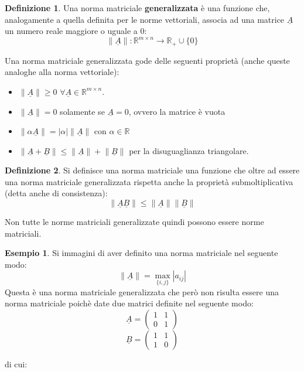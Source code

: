 \documentclass[12pt, a4paper]{book}
\theoremstyle{definition}
\newtheorem{exmp}{Esempio}[section]
\newtheorem{defn}{Definizione}[section]
\newcommand{\VarMtrx}[1]{\ensuremath{\underline{#1}}}
\begin{document}
\begin{flushleft}
\begin{defn}
Una norma matriciale \textbf{generalizzata} è una funzione che,  analogamente a quella definita per le norme vettoriali, associa ad una matrice \VarMtrx{A} un numero reale maggiore o uguale a 0: 
\[ \lVert \VarMtrx{A} \rVert:  \mathbb{R}^{m \times n } \longrightarrow \mathbb{R}_{+} \cup \{0\} \]
\end{defn}
Una norma matriciale generalizzata  gode delle seguenti proprietà (anche queste analoghe alla norma vettoriale): 
\begin{itemize}
	\item $\lVert \VarMtrx{A} \rVert \geq 0$ $\forall \VarMtrx{A} \in \mathbb{R}^{m \times n}$.
	\item $\lVert \VarMtrx{A} \rVert = 0$ solamente se $\VarMtrx{A} = 0$, ovvero la matrice è vuota
	\item $\lVert\alpha \VarMtrx{A}\rVert = |\alpha|\lVert\VarMtrx{A}\rVert$ con $\alpha \in \mathbb{R}$
	\item $\lVert \VarMtrx{A} + \VarMtrx{B}\rVert \leq \lVert \VarMtrx{A}\rVert + \lVert\VarMtrx{B}\rVert$ per la disuguaglianza triangolare.
\end{itemize}

\begin{defn}
Si definisce una norma matriciale una funzione che oltre ad essere una norma matriciale generalizzata rispetta anche la proprietà submoltiplicativa (detta anche di consistenza):
\[ \lVert \VarMtrx{A}\VarMtrx{B}\rVert \leq \lVert \VarMtrx{A}\rVert\lVert\VarMtrx{B}\rVert \]
\end{defn}

Non tutte le norme matriciali generalizzate quindi possono essere norme matriciali. 
\begin{exmp}
Si immagini di aver definito una norma matriciale nel seguente modo: 
\[ \lVert\VarMtrx{A}\rVert = \max_{\{i,j\}} |a_{ij}| \]
Questa è una norma matriciale generalizzata che però non risulta essere una norma matriciale poichè date due matrici definite nel seguente modo: 
\[ 
	\VarMtrx{A} = \begin{pmatrix} 1 & 1 \\ 0 & 1  \end{pmatrix} 
\]
\[ 
	\VarMtrx{B} = \begin{pmatrix} 1 & 1 \\ 1 & 0  \end{pmatrix} 
\]

di cui: 


\end{exmp}
\end{flushleft}
\end{document}
